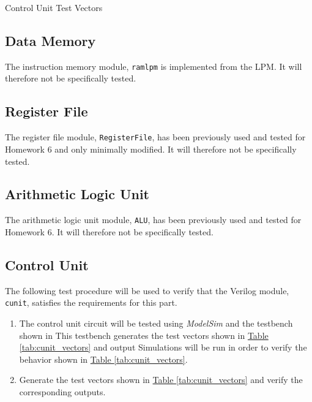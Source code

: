 \begin{table}[htbp]
    \centering
    \caption{Control Unit Test Vectors\label{tab:ir_vectors}}
\end{table}


\subsection{Data Memory} %
\label{sub:data_memory}

The instruction memory module, \verb|ramlpm| is implemented from the LPM.
It will therefore not be specifically tested.

\subsection{Register File} %
\label{sub:register_file}

The register file module, \verb|RegisterFile|, has been previously used and tested for Homework 6 and only minimally modified.
It will therefore not be specifically tested.

\subsection{Arithmetic Logic Unit} %
\label{sub:arithmetic_logic_unit}

The arithmetic logic unit module, \verb|ALU|, has been previously used and tested for Homework 6.
It will therefore not be specifically tested.

\subsection{Control Unit} %
\label{sub:control_unit_pro}

The following test procedure will be used to verify that the Verilog module, \verb|cunit|, satisfies the requirements for this part.

\begin{enumerate}
    \item The control unit circuit will be tested using \emph{ModelSim} and the testbench shown in %
    This testbench generates the test vectors shown in \hyperref[tab:cunit_vectors]{Table \ref*{tab:cunit_vectors}} and output %
    Simulations will be run in order to verify the behavior shown in \hyperref[tab:cunit_vectors]{Table \ref*{tab:cunit_vectors}}.
    \item Generate the test vectors shown in \hyperref[tab:cunit_vectors]{Table \ref*{tab:cunit_vectors}} and verify the corresponding outputs.
\end{enumerate}

